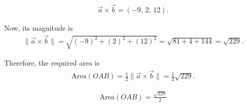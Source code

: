 \documentclass[journal]{IEEEtran}
\begin{document}
\begin{align}
\vec{a} \times \vec{b} = (-9,\, 2,\, 12).
\end{align}

Now, its magnitude is
\begin{align}
\|\vec{a} \times \vec{b}\| = \sqrt{(-9)^2 + (2)^2 + (12)^2}
= \sqrt{81 + 4 + 144} = \sqrt{229}.
\end{align}

Therefore, the required area is
\begin{align}
\text{Area}(OAB) = \frac{1}{2}\|\vec{a} \times \vec{b}\|
= \frac{1}{2}\sqrt{229}.
\end{align}

\begin{align}
\boxed{\text{Area}(OAB) = \frac{\sqrt{229}}{2}}
\end{align}
\end{document}

